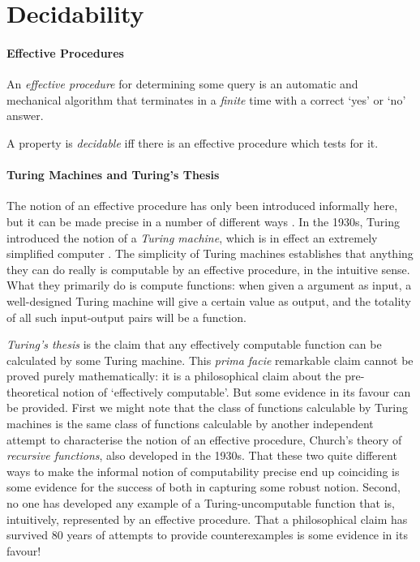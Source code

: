 \section{Decidability}\label{decide}
\paragraph{Effective Procedures}

An \emph{effective procedure} for determining some query is an automatic and mechanical algorithm that terminates in a \emph{finite} time with a correct `yes' or `no' answer. 

A property is \emph{decidable} iff there is an effective procedure which tests for it.



\paragraph{Turing Machines and Turing's Thesis} The notion of an effective procedure has only been introduced informally here, but it can be made precise in a number of different ways \citep[chs.\ 1–8]{bbjcomlo}. In the 1930s, Turing introduced the notion of a \emph{Turing machine}, which is in effect an extremely simplified computer \citep{turoncon}. The simplicity of Turing machines establishes that anything they can do really is computable by an effective procedure, in the intuitive sense. What they primarily do is compute functions: when given a argument as input, a well-designed Turing machine will give a certain value as output, and the totality of all such input-output pairs will be a function.

\emph{Turing's thesis} is the claim that any effectively computable function can be calculated by some Turing machine. This \emph{prima facie} remarkable claim cannot be proved purely mathematically: it is a philosophical claim about the pre-theoretical notion of `effectively computable'. But some evidence in its favour can be provided. First we might note that the class of functions calculable by Turing machines is the same class of functions calculable by another independent attempt to characterise the notion of an effective procedure, Church's theory of \emph{recursive functions}, also developed in the 1930s. That these two quite different ways to make the informal notion of computability precise end up coinciding is some evidence for the success of both in capturing some robust notion. Second, no one has developed any example of a Turing-uncomputable function that is, intuitively, represented by an effective procedure. That a philosophical claim has survived 80 years of attempts to provide counterexamples is some evidence in its favour!


